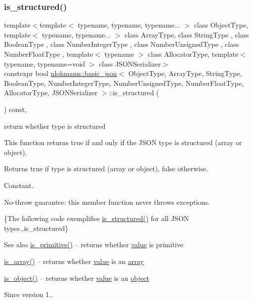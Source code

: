 \subsubsection{\texorpdfstring{is\+\_\+structured()}{is\_structured()}}
{\footnotesize\ttfamily template$<$template$<$ typename, typename, typename... $>$ class Object\+Type, template$<$ typename, typename... $>$ class Array\+Type, class String\+Type , class Boolean\+Type , class Number\+Integer\+Type , class Number\+Unsigned\+Type , class Number\+Float\+Type , template$<$ typename $>$ class Allocator\+Type, template$<$ typename, typename=void $>$ class J\+S\+O\+N\+Serializer$>$ \\
constexpr bool \hyperlink{classnlohmann_1_1basic__json}{nlohmann\+::basic\+\_\+json}$<$ Object\+Type, Array\+Type, String\+Type, Boolean\+Type, Number\+Integer\+Type, Number\+Unsigned\+Type, Number\+Float\+Type, Allocator\+Type, J\+S\+O\+N\+Serializer $>$\+::is\+\_\+structured (\begin{DoxyParamCaption}{ }\end{DoxyParamCaption}) const\hspace{0.3cm}{\ttfamily [inline]}, {\ttfamily [noexcept]}}



return whether type is structured 

This function returns true if and only if the J\+S\+ON type is structured (array or object).

\begin{DoxyReturn}{Returns}
{\ttfamily true} if type is structured (array or object), {\ttfamily false} otherwise.
\end{DoxyReturn}
Constant.

No-\/throw guarantee\+: this member function never throws exceptions.

\{The following code exemplifies {\ttfamily \hyperlink{classnlohmann_1_1basic__json_a9f68a0af820c3ced7f9d17851ce4c22d}{is\+\_\+structured()}} for all J\+S\+ON types.,is\+\_\+structured\}

\begin{DoxySeeAlso}{See also}
\hyperlink{classnlohmann_1_1basic__json_a6362b88718eb5c6d4fed6a61eed44b95}{is\+\_\+primitive()} -- returns whether \hyperlink{classnlohmann_1_1basic__json_adcf8ca5079f5db993820bf50036bf45d}{value} is primitive 

\hyperlink{classnlohmann_1_1basic__json_aef9ce5dd2381caee1f8ddcdb5bdd9c65}{is\+\_\+array()} -- returns whether \hyperlink{classnlohmann_1_1basic__json_adcf8ca5079f5db993820bf50036bf45d}{value} is an \hyperlink{classnlohmann_1_1basic__json_aa80485befaffcadaa39965494e0b4d2e}{array} 

\hyperlink{classnlohmann_1_1basic__json_af8f511af124e82e4579f444b4175787c}{is\+\_\+object()} -- returns whether \hyperlink{classnlohmann_1_1basic__json_adcf8ca5079f5db993820bf50036bf45d}{value} is an \hyperlink{classnlohmann_1_1basic__json_aa13f7c0615867542ce80337cbcf13ada}{object}
\end{DoxySeeAlso}
\begin{DoxySince}{Since}
version 1.. 
\end{DoxySince}


